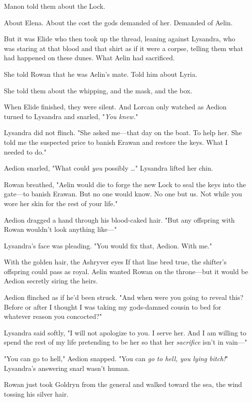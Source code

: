Manon told them about the Lock.

About Elena. About the cost the gods demanded of her. Demanded of Aelin.

But it was Elide who then took up the thread, leaning against Lysandra, who was staring at that blood and that shirt as if it were a corpse, telling them what had happened on these dunes. What Aelin had sacrificed.

She told Rowan that he was Aelin's mate. Told him about Lyria.

She told them about the whipping, and the mask, and the box.

When Elide finished, they were silent. And Lorcan only watched as Aedion turned to Lysandra and snarled, "\emph{You knew.}"

Lysandra did not flinch. "She asked me---that day on the boat. To help her. She told me the suspected price to banish Erawan and restore the keys. What I needed to do."

Aedion snarled, "What could \emph{you} possibly \ldots" Lysandra lifted her chin.

Rowan breathed, "Aelin would die to forge the new Lock to seal the keys into the gate---to banish Erawan. But no one would know. No one but us. Not while you wore her skin for the rest of your life."

Aedion dragged a hand through his blood-caked hair. "But any offspring with Rowan wouldn't look anything like---"

Lysandra's face was pleading. "You would fix that, Aedion. With me."

With the golden hair, the Ashryver eyes  If that line bred true, the shifter's offspring could pass as royal. Aelin wanted Rowan on the throne---but it would be Aedion secretly siring the heirs.

Aedion flinched as if he'd been struck. "And when were you going to reveal this? Before or after I thought I was taking my gods-damned cousin to bed for whatever reason you concocted?"

Lysandra said softly, "I will not apologize to you. I serve her. And I am willing to spend the rest of my life pretending to be her so that her
\emph{sacrifice} isn't in vain---"

"You can go to hell," Aedion snapped. "You can \emph{go to hell, you lying bitch!}" Lysandra's answering snarl wasn't human.

Rowan just took Goldryn from the general and walked toward the sea, the wind tossing his silver hair.

